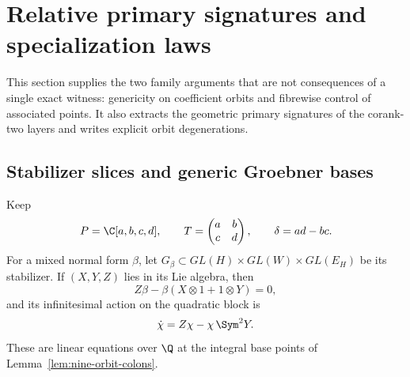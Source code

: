 \section{Relative primary signatures and specialization laws}
\label{sec:relative-primary-specialization}

This section supplies the two family arguments that are not consequences
of a single exact witness: genericity on coefficient orbits and
fibrewise control of associated points.  It also extracts the
geometric primary signatures of the corank-two layers and writes
explicit orbit degenerations.

\subsection{Stabilizer slices and generic Groebner bases}

Keep
\[
 P=\C[a,b,c,d],\qquad
 T=\begin{pmatrix}a&b\\c&d\end{pmatrix},\qquad
 \delta=ad-bc.
\]
For a mixed normal form \(\beta\), let
\(G_\beta\subset GL(H)\times GL(W)\times GL(E_H)\) be its
stabilizer.  If \((X,Y,Z)\) lies in its Lie algebra, then
\begin{equation}\label{eq:stabilizer-linearization}
 Z\beta-\beta(X\otimes1+1\otimes Y)=0,
\end{equation}
and its infinitesimal action on the quadratic block is
\begin{equation}\label{eq:chi-linearization}
 \dot\chi=Z\chi-\chi\,\Sym^2Y.
\end{equation}
These are linear equations over \(\Q\) at the integral base
points of Lemma~\ref{lem:nine-orbit-colons}.

